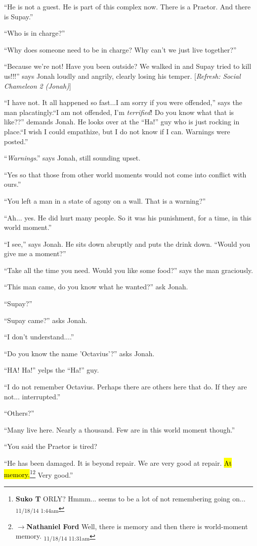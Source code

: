 ``He is not a guest.  He is part of this complex now.  There is a Praetor.  And there is Supay.''

``Who is in charge?''

``Why does someone need to be in charge?  Why can't we just live together?''

``Because we're not!  Have you been outside? We walked in and Supay tried to kill us!!!'' says Jonah loudly and angrily, clearly losing his temper. {[}\textit{Refresh: Social Chameleon 2 (Jonah)}{]}

``I have not. It all happened so fast...I am sorry if you were offended,'' says the man placatingly.``I am not offended, I'm \textit{terrified}!  Do you know what that is like??'' demands Jonah.  He looks over at the ``Ha!'' guy who is just rocking in place.``I wish I could empathize, but I do not know if I can. Warnings were posted.''

``\textit{Warnings}.'' says Jonah, still sounding upset.

``Yes so that those from other world moments would not come into conflict with ours.''

``You left a man in a state of agony on a wall.  That is a warning?''

``Ah... yes.  He did hurt many people.  So it was his punishment, for a time, in this world moment.''

``I see,'' says Jonah.  He sits down abruptly and puts the drink down.  ``Would you give me a moment?''

``Take all the time you need.  Would you like some food?'' says the man graciously.

``This man came, do you know what he wanted?'' ask Jonah.

``Supay?''

``Supay came?'' asks Jonah.

``I don't understand....''

``Do you know the name 'Octavius'?'' asks Jonah.

``HA!  Ha!'' yelps the ``Ha!'' guy.

``I do not remember Octavius. Perhaps there are others here that do.  If they are not... interrupted.''

``Others?''

``Many live here.  Nearly a thousand.  Few are in this world moment though.''

``You said the Praetor is tired?

``He has been damaged.  It is beyond repair.  We are very good at repair.  \hl{At memory.}\footnote{\textbf{Suko T }ORLY?  Hmmm... seems to be a lot of not remembering going on... \textsubscript{11/18/14 1:44am}}\footnote{$\rightarrow$\textbf{Nathaniel Ford} Well, there is memory and then there is world-moment memory. \textsubscript{11/18/14 11:31am}}  Very good.''

